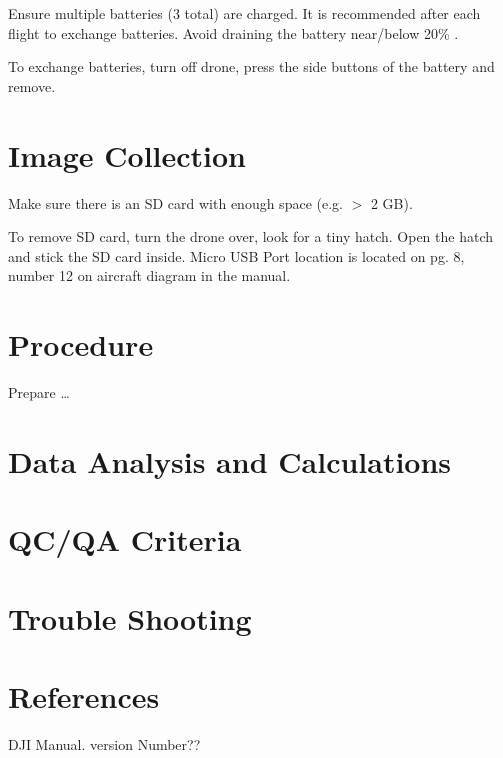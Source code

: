 \documentclass[12pt]{../SOP4_alpha}\usepackage[]{graphicx}\usepackage[]{color}
\begin{document}
\NP Ensure multiple batteries (3 total) are charged. It is recommended after each flight to exchange batteries. Avoid draining the battery near/below 20\% .

\NP To exchange batteries, turn off drone, press the side buttons of the battery and remove.


\section{Image Collection}

\NP Make sure there is an SD card with enough space (e.g. $ > $ 2 GB).

\NP To remove SD card, turn the drone over, look for a tiny hatch. Open the hatch and stick the SD card inside. Micro USB Port location is located on pg. 8, number 12 on aircraft diagram in the manual.

\section{Procedure}

\NP Prepare \dots

\NP

\section{Data Analysis and Calculations}

\section{QC/QA Criteria}

\section{Trouble Shooting}

\section{References}

\NP DJI Manual. version Number??
\end{document}
